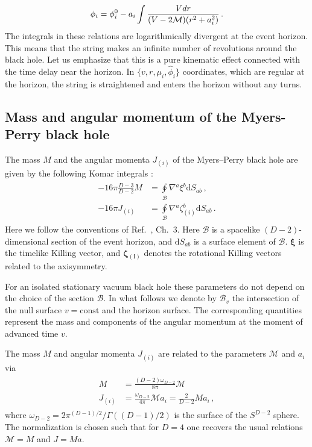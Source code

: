 \documentclass[superscriptaddress,twocolumn,showpacs,
preprintnumbers,amsmath,amssymb,nofootinbib,
longbibliography,aps,prd,10pt]{revtex4-1}
\newcommand{\ts}[1]{{\boldsymbol{#1}}}         %
\newcommand{\dd}{\mbox{d}}
\newcommand{\be}{\begin{equation}}             %
\newcommand{\ee}{\end{equation}}               %
\newcommand{\n}[1]{\label{#1}}
\begin{document}
\be\n{FiFi}
\phi_i=\phi^0_i-a_i\int {V dr\over (V-2\mathcal{M}) (r^2+a_i^2)}\, .
\ee
The integrals in these relations are logarithmically divergent at the event horizon. This means that the string makes an infinite number of revolutions around the black hole. Let us emphasize that this is a pure kinematic effect connected with the time delay near the horizon. In $\{v,r,\mu_i,\hat{\phi}_i\}$ coordinates, which are regular at the horizon, the string is straightened and enters the horizon without any turns.

\subsection{Mass and angular momentum of the Myers-Perry black hole}

The mass $M$ and the angular momenta $J_{(i)}$ of the Myers--Perry black hole are given by the following Komar integrals \cite{Myers:1986un}:
\begin{align}
\begin{split}
-16 \pi \frac{D-3}{D-2} M &= \oint\limits_{\mathcal{B}}
 \nabla{}^a \xi{}^b \dd S{}_{ab} \, , \label{eq:horizon-mass-angular-momentum} \\
-16 \pi J_{(i)} &= \oint\limits_{\mathcal{B}}  \nabla{}^a \zeta{}_{(i)}^b \dd S{}_{ab} \, .
\end{split}
\end{align}
Here we follow the conventions of Ref.~\cite{Poisson:2004}, Ch.~3. Here $\mathcal{B}$
is a spacelike $(D-2)$-dimensional section of the event horizon, and $\dd S{}_{ab}$ is a surface element of $\mathcal{B}$. $\ts{\xi}$ is the timelike Killing vector, and $\ts{\zeta{}_{(i)}}$ denotes the rotational Killing vectors related to the axisymmetry.

For an isolated stationary vacuum black hole these parameters do not depend on the choice of the section $\mathcal{B}$. In what follows we denote by $\mathcal{B}_v$  the intersection of the null surface $v= \text{const}$ and the horizon surface. The corresponding quantities represent the mass and components of the angular momentum at the moment of advanced time $v$.

The mass $M$ and angular momenta $J_{(i)}$ are related to the parameters $\mathcal{M}$ and $a_i$ via \cite{Myers:2011yc}
\begin{align}
\begin{split}
M &= \frac{(D-2)\omega_{D-2}}{8\pi} \mathcal{M} \, \\
J_{(i)} &= \frac{\omega_{D-2}}{4\pi}\mathcal{M} a_i = \frac{2}{D-2} M a_i \, ,
\end{split}
\end{align}
where $\omega_{D-2} = 2 \pi^{(D-1)/2}/\Gamma((D-1)/2)$ is the surface of the $S^{D-2}$ sphere. The normalization is chosen such that for $D=4$ one recovers the usual relations $\mathcal{M} = M$ and $J = M a$.
\end{document}
